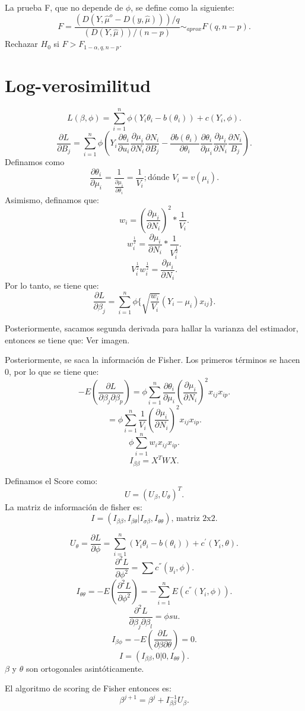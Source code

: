 \documentclass{article}
\begin{document}
La prueba F, que no depende de $\phi$, se define como la siguiente:
\[ F=\frac{{(D{(Y,\hat{\mu}^{o}-D{(y,\hat{\mu})})})}/q}{{(D{(Y,\hat{\mu})})}/{(n-p)}} \sim_{aprox} F{(q,n-p)}.\]
Rechazar $H_{0}$ si $F > F_{1-\alpha,q,n-p}$.

\section{Log-verosimilitud}
\[ L(\beta,\phi)=\sum_{i=1}^{n}\phi{(Y_{i}\theta_{i}-b{(\theta_{i})})}+c{(Y_{i},\phi)}.\]
\[ \frac{\partial L}{\partial B_{j}}=\sum_{i=1}^{n} \phi{(Y_{i}\frac{\partial \theta_{i}}{\partial u_{i}}\frac{\partial \mu_{i}}{\partial N_{i}}\frac{\partial N_{i}}{\partial B_{j}}-\frac{\partial b{(\theta_{i})}}{\partial \theta_{i}}\frac{\partial \theta_{i}}{\partial \mu_{i}}\frac{\partial \mu_{i}}{\partial N_{i}}\frac{\partial N_{i}}{B_{j}})}.\]
Definamos como
\[ \frac{\partial \theta_{i}}{\partial \mu_{i}}=\frac{1}{\frac{\partial \mu_{i}}{\partial \theta_{i}}}=\frac{1}{V_{i}}; \text{dónde $V_{i}=v(\mu_{i})$}.\]
Asimismo, definamos que:
\[ w_{i}={(\frac{\partial \mu_{i}}{\partial N_{i}})}^{2} * \frac{1}{V_{i}}.\]
\[ w_{i}^{\frac{1}{2}}=\frac{\partial \mu_{i}}{\partial N_{i}}*\frac{1}{V_{i}^{\frac{1}{2}}}.\]
\[ V_{i}^{\frac{1}{2}}w_{i}^{\frac{1}{2}}=\frac{\partial \mu_{i}}{\partial N_{i}}.\]
Por lo tanto, se tiene que:
\[ \frac{\partial L}{\partial \beta_{j}}=\sum_{i=1}^{n}\phi\{\sqrt{\frac{w_{i}}{V_{i}}}{(Y_{i}-\mu_{i})}x_{ij}\}.\]

Posteriormente, sacamos segunda derivada para hallar la varianza del estimador, entonces se tiene que:
Ver imagen.

Posteriormente, se saca la información de Fisher. Los primeros términos se hacen 0, por lo que se tiene que:
\[ -E{(\frac{\partial L}{\partial \beta_{j}\partial \beta_{p}})}=\phi \sum_{i=1}^{n}\frac{\partial \theta_{i}}{\partial \mu_{i}}{(\frac{\partial \mu_{i}}{\partial N_{i}})}^{2}x_{ij}x_{ip}.\]
\[ = \phi \sum_{i=1}^{n}\frac{1}{V_{i}}{(\frac{\partial \mu_{i}}{\partial N_{i}})}^{2}x_{ij}x_{ip}.\]
\[ \phi \sum_{i=1}^{n}w_{i}x_{ij}x_{ip}.\]
\[ I_{\beta\beta}=X^{T}WX.\]

Definamos el Score como:
\[ U = {(U_{\beta},U_{\theta})}^{T}.\]
La matriz de información de fisher es:
\[ I={(I_{\beta\beta},I_{\beta\theta} | I_{\sigma\beta}, I_{\theta\theta})}\text{, matriz 2x2}.\]

\[ U_{\theta}=\frac{\partial L}{\partial \phi}=\sum_{i=1}^{n}{(Y_{i}\theta_{i}-b{(\theta_{i})})}+c^{'}{(Y_{i},\theta)}.\]
\[ \frac{\partial^{2}L}{\partial \phi^{2}}=\sum c^{''}{(y_{i},\phi)}.\]
\[ I_{\theta\theta}=-E{(\frac{\partial^{2}L}{\partial \phi^{2}})}=-\sum_{i=1}^{n}E{(c^{''}{(Y_{i},\phi)})}.\]
\[ \frac{\partial^{2} L }{\partial \beta_{j}\partial \beta_{l}}=\phi su.\]
\[ I_{\beta\phi}=-E{(\frac{\partial L}{\partial \beta\partial \theta})}=0.\]
\[ I ={(I_{\beta\beta},0 | 0, I_{\theta\theta})}.\]
$\beta$ y $\theta$ son ortogonales asintóticamente.

El algoritmo de scoring de Fisher entonces es:
\[ \beta^{j+1}=\beta^{j}+I_{\beta\beta}^{-1}U_{\beta}.\]
\end{document}
